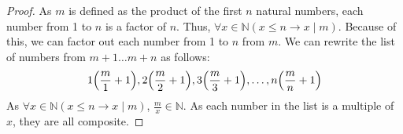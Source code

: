 \documentclass[article, 12pt]{article}
\theoremstyle{definition}
\DeclarePairedDelimiter\paren{(}{)} %
\newcommand{\nats}{\mathbb{N}}
\begin{document}
    \begin{proof}
        As $m$ is defined as the product of the first $n$ natural numbers, each number from 1 to $n$ is a factor of $n$. Thus, $\forall x \in \nats (x \leq n \to x \mid m)$. Because of this, we can factor out each number from 1 to $n$ from $m$. We can rewrite the list of numbers from $m+1 \dots m+n$ as follows:
        \[ 1\paren*{\frac{m}{1}+1}, 2\paren*{\frac{m}{2} + 1}, 3\paren*{\frac{m}{3} + 1}, \dots, n\paren*{\frac{m}{n} + 1} \]
        As $\forall x \in \nats (x \leq n \to x \mid m)$, $\displaystyle\frac{m}{x} \in \nats$. As each number in the list is a multiple of $x$, they are all composite.
    \end{proof}
    
\end{document}
